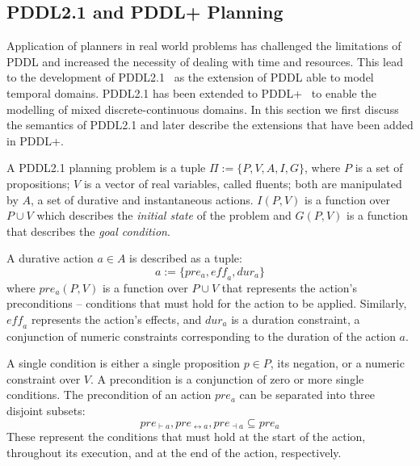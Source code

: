 \subsection{PDDL2.1 and PDDL+ Planning}

Application of planners in real world problems has challenged the limitations of PDDL and increased the necessity of dealing with time and resources. This lead to the development of PDDL2.1~\cite{fox03} as the extension of PDDL able to model temporal domains. PDDL2.1 has been extended to PDDL+~\cite{pddl+} to enable the modelling of mixed discrete-continuous domains. In this section we first discuss the semantics of PDDL2.1 and later describe the extensions that have been added in PDDL+.

\begin{definition}\label{def:pddl21}
A PDDL2.1 planning problem is a tuple $\Pi:=\{P,V,A,I,G\}$, where $P$ is a set of propositions; $V$ is a vector of real variables, called fluents; both are manipulated by $A$, a set of durative and instantaneous actions.
$I(P,V)$ is a function over $P\cup V$ which describes the \textit{initial state} of the problem and $G(P,V)$ is a function that describes the \textit{goal condition}.
\end{definition}

A durative action $a \in A$ is described as a tuple:
$$
a:=\{pre_{a},\mathit{eff}_{a},dur_{a}\}
$$
where $pre_{a}(P,V)$ is a function over $P\cup V$ that represents the action's preconditions -- conditions that must hold for the action to be applied. Similarly, $\mathit{eff}_{a}$ represents the action's effects, and $dur_{a}$ is a duration constraint, a conjunction of numeric constraints corresponding to the duration of the action $a$.

A single condition is either a single proposition $p\in P$, its negation, or a numeric constraint over $V$. A precondition is a conjunction of zero or more single conditions. The precondition of an action $pre_a$ can be separated into three disjoint subsets:
$$
pre_{\vdash a}, pre_{\leftrightarrow a}, pre_{\dashv a}\subseteq pre_{a}
$$
These represent the conditions that must hold at the start of the action, throughout its execution, and at the end of the action, respectively.

